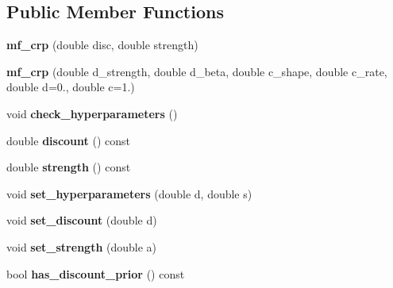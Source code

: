 \subsection*{Public Member Functions}
\begin{DoxyCompactItemize}
\item 
\mbox{\label{classcpyp_1_1mf__crp_a9528e5f92d3d894f745e74a15a50f930}} 
{\bfseries mf\+\_\+crp} (double disc, double strength)
\item 
\mbox{\label{classcpyp_1_1mf__crp_a266fdd5bbb0eb7416fa61b492f5213cf}} 
{\bfseries mf\+\_\+crp} (double d\+\_\+strength, double d\+\_\+beta, double c\+\_\+shape, double c\+\_\+rate, double d=0., double c=1.)
\item 
\mbox{\label{classcpyp_1_1mf__crp_a1389aa5d01aa5fc6df15c327b856d460}} 
void {\bfseries check\+\_\+hyperparameters} ()
\item 
\mbox{\label{classcpyp_1_1mf__crp_a9694600e6d4cbdde3a173ae05f7b412b}} 
double {\bfseries discount} () const
\item 
\mbox{\label{classcpyp_1_1mf__crp_a01818cfd2069bd366aa2923bc1a8b49a}} 
double {\bfseries strength} () const
\item 
\mbox{\label{classcpyp_1_1mf__crp_ab50771a94b82f6e504edbcb14b2cec5c}} 
void {\bfseries set\+\_\+hyperparameters} (double d, double s)
\item 
\mbox{\label{classcpyp_1_1mf__crp_a9210ff188ae4f11d1383c9e279271780}} 
void {\bfseries set\+\_\+discount} (double d)
\item 
\mbox{\label{classcpyp_1_1mf__crp_afe4b482d705075ddc9fcde01bc439ad5}} 
void {\bfseries set\+\_\+strength} (double a)
\item 
\mbox{\label{classcpyp_1_1mf__crp_a0e699421ee1e1bf6141b23cecc0c2107}} 
bool {\bfseries has\+\_\+discount\+\_\+prior} () const
\item 
\mbox{\label{classcpyp_1_1mf__crp_aa4341174b371e8433ab5679aeecb3259}} 

\end{DoxyCompactItemize}
